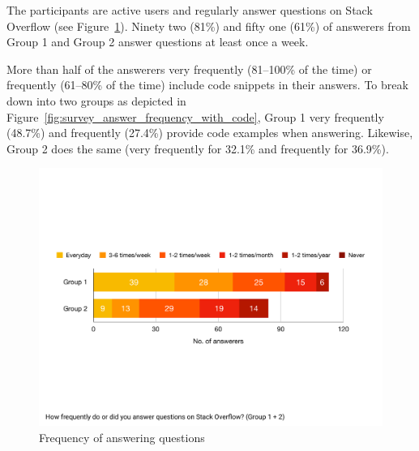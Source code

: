 \documentclass{svjour3}                     %
\begin{document}
The participants are active users and regularly answer questions on Stack Overflow (see Figure~\ref{fig:survey_answer_frequency}). Ninety two (81\%) and fifty one (61\%) of answerers from Group 1 and Group 2  answer questions at least once a week.

More than half of the answerers very frequently (81--100\% of the time) or frequently (61--80\% of the time) include code snippets in their answers. To break down into two groups as depicted in Figure~\ref{fig:survey_answer_frequency_with_code},
Group 1 very frequently (48.7\%) and frequently (27.4\%) provide code examples when answering. Likewise, Group 2 does the same (very frequently for 32.1\% and frequently for 36.9\%).


\begin{figure}
		\centering
		\includegraphics[width=0.8\linewidth]{survey_answer_frequency}
		\caption{Frequency of answering questions}
		\label{fig:survey_answer_frequency}
\end{figure}

\end{document}
